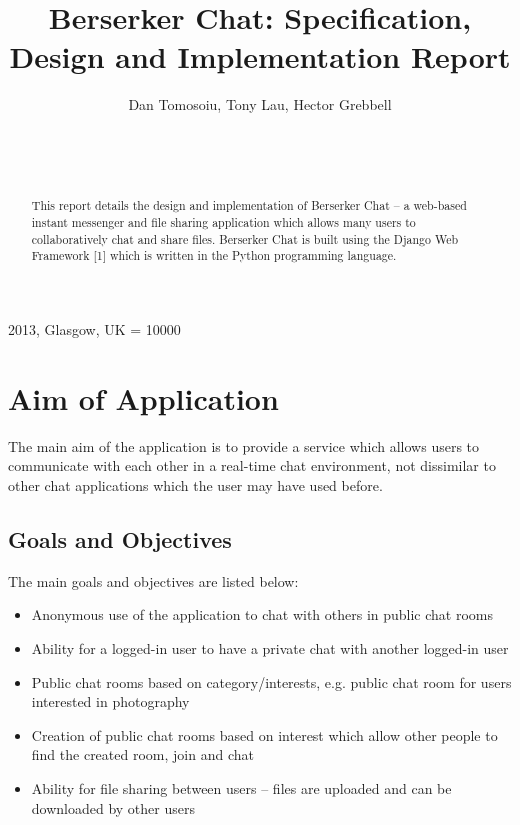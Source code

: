 \documentclass{sig-alt-release2}
\begin{document}
\newcommand{\todo}[1]{\textcolor{red}{#1}}
\def\newblock{\hskip .11em plus .33em minus .07em}

 {2013, Glasgow, UK} 
\widowpenalty = 10000

\title{{Berserker Chat: Specification, Design and Implementation Report}}

\author{
\alignauthor Dan Tomosoiu, Tony Lau, Hector Grebbell\\
\\
\\
\\
}
\maketitle

\begin{abstract}
This report details the design and implementation of Berserker Chat --
a web-based instant messenger and file sharing application which allows many users to
collaboratively chat and share files. Berserker Chat is built using the Django Web Framework [1]
which is written in the Python programming language.

\end{abstract}

\section{Aim of Application}
The main aim of the application is to provide a service which allows users to communicate with each other in a real-time
chat environment, not dissimilar to other chat applications which the user may have used before.

\subsection{Goals and Objectives}
\label{sec: goals}
The main goals and objectives are listed below:
\begin{itemize}
\item Anonymous use of the application to chat with others in public chat rooms
\item Ability for a logged-in user to have a private chat with another logged-in user
\item Public chat rooms based on category/interests, e.g. public chat room for users interested in photography
\item Creation of public chat rooms based on interest which allow other people to find the created room, join and chat
\item Ability for file sharing between users -- files are uploaded and can be downloaded by other users 
\end{itemize}
\end{document}

